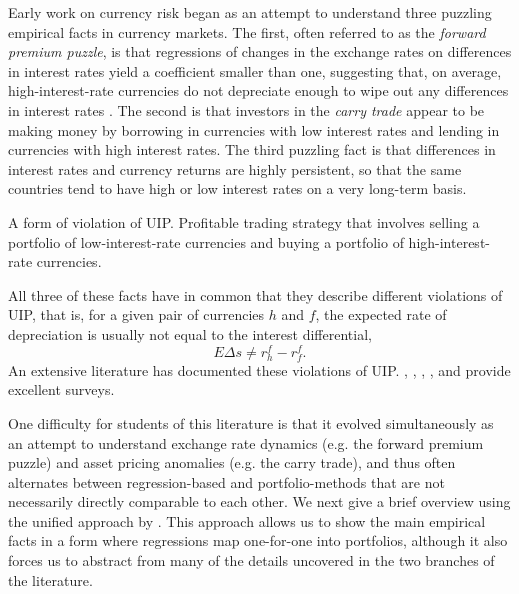 \documentclass{ar-1col}
\begin{document}
Early work on currency risk began as an attempt to understand three puzzling empirical facts in currency markets. The first, often referred to as the \textit{forward premium puzzle}, is that regressions of changes in the exchange rates on differences in interest rates yield a coefficient smaller than one, suggesting that, on average, high-interest-rate currencies do not depreciate enough to wipe out any differences in interest rates \citep{Bilson1981, Fama1984}. The second is that investors in the \textit{carry trade} appear to be making money by borrowing in currencies with low interest rates and lending in currencies with high interest rates. The third puzzling fact is that differences in interest rates and currency returns are highly persistent, so that the same countries tend to have high or low interest rates on a very long-term basis.

\begin{marginnote}[]
    
   {A form of violation of UIP. Profitable trading strategy that involves selling a portfolio of low-interest-rate currencies and buying a portfolio of high-interest-rate currencies.} 
\end{marginnote}


All three of these facts have in common that they describe different violations of UIP, that is, for a given pair of currencies $h$ and $f$, the expected rate of depreciation is usually not equal to the interest differential, $$E\Delta s \neq r^f_h-r^f_f .$$ An extensive literature has documented these violations of UIP. \citet{Hodrick1987}, \citet{FrootThaler1990}, \citet{Engel1996}, \citet{Lewis2011}, and \citet{Engel2014} provide excellent surveys.

One difficulty for students of this literature is that it evolved simultaneously as an attempt to understand exchange rate dynamics (e.g. the forward premium puzzle) and asset pricing anomalies (e.g. the carry trade), and thus often alternates between regression-based and portfolio-methods that are not necessarily directly comparable to each other. We next give a brief overview using the unified approach by \citet{HassanMano2019}. This approach allows us to show the main empirical facts in a form where regressions map one-for-one into portfolios, although it also forces us to abstract from many of the details uncovered in the two branches of the literature.
\end{document}
